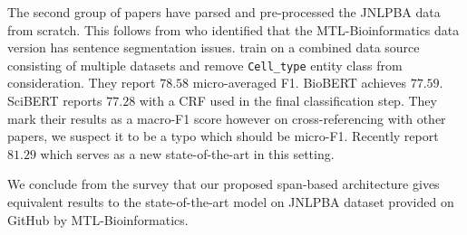 The second group of papers have parsed and pre-processed the JNLPBA data from scratch. This follows from \cite{yoon2019collabonet} who identified that the MTL-Bioinformatics data version has sentence segmentation issues. \cite{yoon2019collabonet} train on a combined data source consisting of multiple datasets and remove \texttt{Cell\_type} entity class from consideration. They report $78.58$ micro-averaged F1. BioBERT\cite{lee2020biobert} achieves $77.59$. SciBERT\cite{beltagy2019scibert} reports $77.28$ with a CRF used in the final classification step. They mark their results as a macro-F1 score however on cross-referencing with other papers, we suspect it to be a typo which should be micro-F1. Recently \cite{kocaman2021spark} report $81.29$ which serves as a new state-of-the-art in this setting.

We conclude from the survey that our proposed span-based architecture gives equivalent results to the state-of-the-art model on JNLPBA dataset provided on GitHub by MTL-Bioinformatics\cite{crichton2017neural}.
